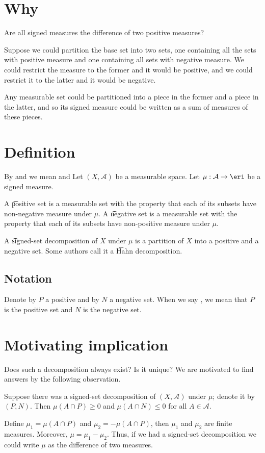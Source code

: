 

\section*{Why}

Are all signed measures
the difference of two
positive measures?

Suppose we could partition
the base set into two
sets, one containing
all the sets with positive
measure and one containing
all sets with negative measure.
We could restrict the measure to the former and it would be positive, and we could restrict it to the latter and it would be negative.

Any measurable set could be partitioned
into a piece in the former and a
piece in the latter, and so
its signed measure could be
written as a sum of measures
of these pieces.

\section*{Definition}

By  and  we mean  and 
Let $(X, \mathcal{A} )$ be a measurable space.
Let $\mu : \mathcal{A}  \to \eri$
be a signed measure.

A \t{positive set}
is a measurable set
with the property that
each of its subsets have
non-negative measure
under $\mu $.
A \t{negative set}
is a measurable set
with the property that
each of its subsets have
non-positive measure
under $\mu $.

A \t{signed-set decomposition}
of $X$ under $\mu $
is a partition of $X$
into a positive and a negative set.
Some authors call it a
\t{Hahn decomposition}.

\subsection*{Notation}

Denote by $P$ a positive
and by $N$ a negative set.
When we say ,
we mean that $P$ is
the positive set and $N$
is the negative set.

\section*{Motivating implication}

Does such a decomposition
always exist? Is it unique?
We are motivated to find
answers
by the following observation.

Suppose there was a signed-set
decomposition of $(X, \mathcal{A} )$
under $\mu $; denote it by $(P, N)$.
Then
$\mu (A \cap  P) \geq 0$
and $\mu (A \cap  N) \leq 0$
for all $A \in \mathcal{A} $.

Define
$\mu _1 = \mu (A \cap  P)$
and $\mu _2 = -\mu (A \cap  P)$,
then $\mu _1$ and $\mu _2$ are finite measures.
Moreover, $\mu  = \mu _1 - \mu _2$.
Thus, if we had a signed-set decomposition
we could write $\mu $ as the difference
of two measures.
